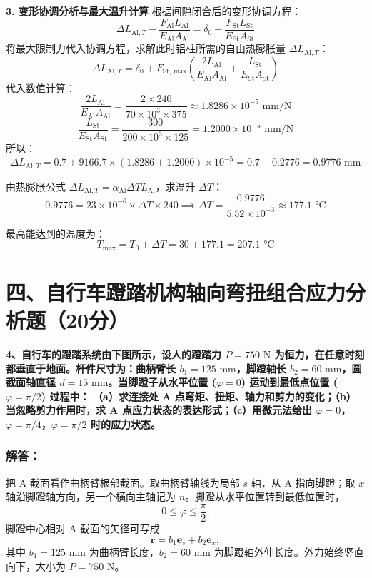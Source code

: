 \documentclass[11pt,a4paper]{ctexrep}
\begin{document}
{\textbf{3. 变形协调分析与最大温升计算}
根据间隙闭合后的变形协调方程：
\[
    \Delta L_{\text{Al}, T} - \frac{F_{\text{Al}} L_{\text{Al}}}{E_{\text{Al}} A_{\text{Al}}} = \delta_0 + \frac{F_{\text{St}} L_{\text{St}}}{E_{\text{St}} A_{\text{St}}}
\]
将最大限制力代入协调方程，求解此时铝柱所需的自由热膨胀量 $\Delta L_{\text{Al}, T}$：
\[
    \Delta L_{\text{Al}, T} = \delta_0 + F_{\text{St, max}} \left( \frac{2 L_{\text{Al}}}{E_{\text{Al}} A_{\text{Al}}} + \frac{L_{\text{St}}}{E_{\text{St}} A_{\text{St}}} \right)
\]
代入数值计算：
\[
    \frac{2 L_{\text{Al}}}{E_{\text{Al}} A_{\text{Al}}} = \frac{2 \times 240}{70 \times 10^3 \times 375} \approx 1.8286 \times 10^{-5}\text{ mm/N}
\]
\[
    \frac{L_{\text{St}}}{E_{\text{St}} A_{\text{St}}} = \frac{300}{200 \times 10^3 \times 125} = 1.2000 \times 10^{-5}\text{ mm/N}
\]
所以：
\[
    \Delta L_{\text{Al}, T} = 0.7 + 9166.7 \times (1.8286 + 1.2000) \times 10^{-5} = 0.7 + 0.2776 = 0.9776\text{ mm}
\]

由热膨胀公式 $\Delta L_{\text{Al}, T} = \alpha_{\text{Al}} \Delta T L_{\text{Al}}$，求温升 $\Delta T$：
\[
    0.9776 = 23 \times 10^{-6} \times \Delta T \times 240 \implies \Delta T = \frac{0.9776}{5.52 \times 10^{-3}} \approx 177.1\text{ °C}
\]

最高能达到的温度为：
\[
    T_{\max} = T_0 + \Delta T = 30 + 177.1 = 207.1\text{ °C}
\]




\section*{四、自行车蹬踏机构轴向弯扭组合应力分析题（20分）}

\textbf{4、自行车的蹬踏系统由下图所示，设人的蹬踏力 $P=750\text{ N}$ 为恒力，在任意时刻都垂直于地面。杆件尺寸为：曲柄臂长 $b_1 = 125\text{ mm}$，脚蹬轴长 $b_2 = 60\text{ mm}$，圆截面轴直径 $d=15\text{ mm}$。当脚蹬子从水平位置 ($\varphi=0$) 运动到最低点位置 ($\varphi=\pi/2$) 过程中：}
\textbf{（a）求连接处 A 点弯矩、扭矩、轴力和剪力的变化；（b）当忽略剪力作用时，求 A 点应力状态的表达形式；（c）用微元法给出 $\varphi=0$，$\varphi=\pi/4$，$\varphi=\pi/2$ 时的应力状态。}

\subsubsection*{解答：}

把 A 截面看作曲柄臂根部截面。取曲柄臂轴线为局部 $s$ 轴，从 A 指向脚蹬；取 $x$ 轴沿脚蹬轴方向，另一个横向主轴记为 $n$。脚蹬从水平位置转到最低位置时，
\[
    0\le \varphi\le \frac{\pi}{2}.
\]
脚蹬中心相对 A 截面的矢径可写成
\[
    \boldsymbol r=b_1\boldsymbol e_s+b_2\boldsymbol e_x,
\]
其中 $b_1=125\text{ mm}$ 为曲柄臂长度，$b_2=60\text{ mm}$ 为脚蹬轴外伸长度。外力始终竖直向下，大小为 $P=750\text{ N}$。

}
\end{document}
